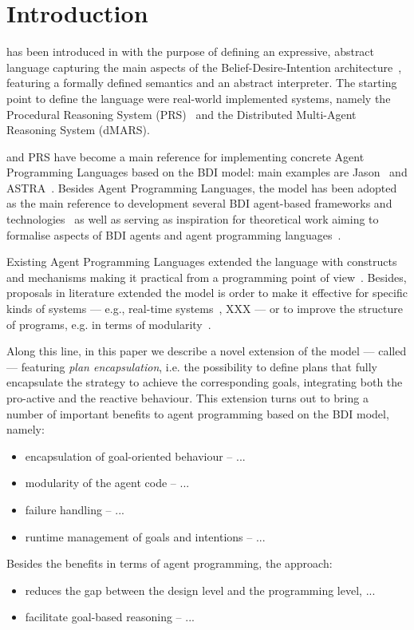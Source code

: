 \section{Introduction}
\label{sec:intro}


%
%
{\asl} has been introduced in \cite{Rao96}  with the purpose of defining an expressive, 
abstract language capturing the main aspects of the Belief-Desire-Intention architecture~\cite{Bratman88,Georgeff:1987:RRP:1863766.1863818}, featuring a formally defined semantics and an abstract interpreter.
%
The starting point to define the language were real-world implemented systems, namely the
Procedural Reasoning System (PRS)~\cite{Ingrand:1992:ARR:629535.629890} and the Distributed Multi-Agent Reasoning System (dMARS).
%

%
% 
{\asl}  and PRS have become a main reference for implementing concrete Agent Programming Languages 
based on the BDI model: 
%
main examples are Jason~\cite{jason06,bordini:07} and ASTRA~\cite{DBLP:conf/prima/CollierRL15}.
%
Besides Agent Programming Languages,  the {\asl}  model has been
adopted as the main reference to development several BDI agent-based
frameworks and technologies~\cite{BordiniMAPlpa,BordiniMAPlta} as well
as serving as inspiration for theoretical work aiming to formalise
aspects of BDI agents and agent programming
languages~\cite{SardinaThangCAN,LouiseAIL,BordiniMCAPL}.


%
%
Existing Agent Programming Languages extended the language with
constructs and mechanisms making it practical from a programming point
of view~\cite{jason06}.
%
Besides, proposals in literature extended the model is order to make
it effective for specific kinds of systems --- e.g., real-time
systems~\cite{Vikhorev:2011:APP:2030470.2030529}, XXX --- or to
improve the structure of programs, e.g. in terms of
modularity~\cite{Madden2010,Nunes2014}.

%
Along this line, in this paper we describe a novel extension of the
{\asl} model --- called {\aser} --- featuring \emph{plan
  encapsulation}, i.e. the possibility to define plans that fully
encapsulate the strategy to achieve the corresponding goals,
integrating both the pro-active and the reactive behaviour.
%
%
This extension turns out to bring a number of important benefits to
agent programming based on the BDI model, namely:
%
\begin{itemize}
\item encapsulation of goal-oriented behaviour -- ...
\item modularity of the agent code -- ...
\item failure handling -- ...
\item runtime management of goals and intentions -- ...
\end{itemize}
%
\noindent Besides the benefits in terms of agent programming, the approach:
%
\begin{itemize}
\item reduces the gap between the design level and the programming level,  ...
\item facilitate goal-based reasoning -- ...
\end{itemize}

